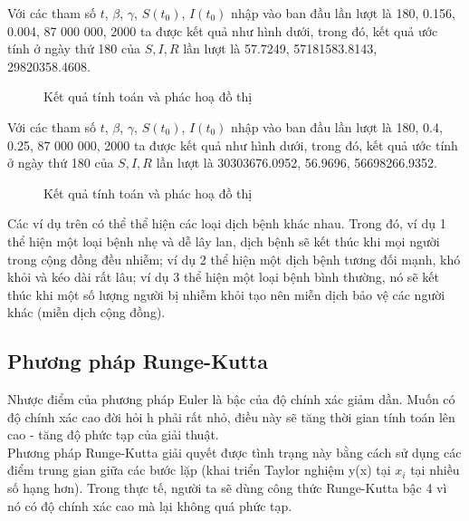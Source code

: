 \documentclass[a4paper]{article}
\begin{document}
Với các tham số $t$, $\beta$, $\gamma$, $S(t_0)$, $I(t_0)$ nhập vào ban đầu lần lượt là 180, 0.156, 0.004, 87 000 000, 2000 ta được kết quả như hình dưới, trong đó, kết quả ước tính ở ngày thứ 180 của $S, I, R$ lần lượt là 57.7249, 57181583.8143, 29820358.4608.
\begin{figure}[ht]
    \newline
    \newline
    \label{pic: test_SIR_1}
    \caption{Kết quả tính toán và phác hoạ đồ thị}
\end{figure}

Với các tham số $t$, $\beta$, $\gamma$, $S(t_0)$, $I(t_0)$ nhập vào ban đầu lần lượt là 180, 0.4, 0.25, 87 000 000, 2000 ta được kết quả như hình dưới, trong đó, kết quả ước tính ở ngày thứ 180 của $S, I, R$ lần lượt là 30303676.0952, 56.9696, 56698266.9352.
\begin{figure}[ht]
    \newline
    \newline
    \label{pic: test_SIR_1}
    \caption{Kết quả tính toán và phác hoạ đồ thị}
\end{figure}

Các ví dụ trên có thể thể hiện các loại dịch bệnh khác nhau. Trong đó, ví dụ 1 thể hiện một loại bệnh nhẹ và dễ lây lan, dịch bệnh sẽ kết thúc khi mọi người trong cộng đồng đều nhiễm; ví dụ 2 thể hiện một dịch bệnh tương đối mạnh, khó khỏi và kéo dài rất lâu; ví dụ 3 thể hiện một loại bệnh bình thường, nó sẽ kết thúc khi một số lượng người bị nhiễm khỏi tạo nên miễn dịch bảo vệ các người khác (miễn dịch cộng đồng).

\newpage
\subsection{Phương pháp Runge-Kutta}

Nhược điểm của phương pháp Euler là bậc của độ chính xác giảm dần. Muốn có độ chính xác cao đời hỏi h phải rất nhỏ, điều này sẽ tăng thời gian tính toán lên cao - tăng độ phức tạp của giải thuật.\\
Phương pháp Runge-Kutta giải quyết được tình trạng này bằng cách sử dụng các điểm trung gian giữa các bước lặp (khai triển Taylor nghiệm y(x) tại $x_{i}$ tại nhiều số hạng hơn). Trong thực tế, người ta sẽ dùng công thức Runge-Kutta bậc 4 vì nó có độ chính xác cao mà lại không quá phức tạp.
\end{document}
